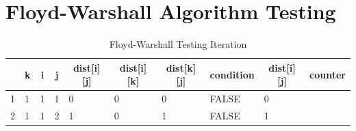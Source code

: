 \section{Floyd-Warshall Algorithm Testing}
\begin{table}[h!]
	\centering
	\caption{Floyd-Warshall Testing Iteration}
	\label{my-label}
	\begin{tabular}{|l|l|l|l|l|l|l|l|l|l|}
		\hline
		\rowcolor[HTML]{C0C0C0} 
		\multicolumn{1}{|c|}{\cellcolor[HTML]{C0C0C0}\textbf{iter}} & \multicolumn{1}{c|}{\cellcolor[HTML]{C0C0C0}\textbf{k}} & \multicolumn{1}{c|}{\cellcolor[HTML]{C0C0C0}\textbf{i}} & \multicolumn{1}{c|}{\cellcolor[HTML]{C0C0C0}\textbf{j}} & \multicolumn{1}{c|}{\cellcolor[HTML]{C0C0C0}\textbf{dist{[}i{]}{[}j{]}}} & \multicolumn{1}{c|}{\cellcolor[HTML]{C0C0C0}\textbf{dist{[}i{]}{[}k{]}}} & \multicolumn{1}{c|}{\cellcolor[HTML]{C0C0C0}\textbf{dist{[}k{]}{[}j{]}}} & \multicolumn{1}{c|}{\cellcolor[HTML]{C0C0C0}\textbf{condition}} & \multicolumn{1}{c|}{\cellcolor[HTML]{C0C0C0}\textbf{dist{[}i{]}{[}j{]}}} & \multicolumn{1}{c|}{\cellcolor[HTML]{C0C0C0}\textbf{counter}} \\ \hline
		1                                                           & 1                                                       & 1                                                       & 1                                                       & 0                                                                        & 0                                                                        & 0                                                                        & FALSE                                                           & 0                                                                        &                                                               \\ \hline
		2                                                           & 1                                                       & 1                                                       & 2                                                       & 1                                                                        & 0                                                                        & 1                                                                        & FALSE                                                           & 1                                                                        &                                                               \\ \hline

\end{tabular}
\end{table}
